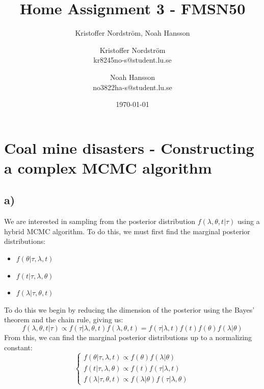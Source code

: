 \documentclass[a4paper]{article}
\title{Home Assignment 3 - FMSN50}
\author{Kristoffer Nordström, Noah Hansson}\author{Kristoffer Nordström \\ kr8245no-s@student.lu.se \and  Noah Hansson \\ no3822ha-s@student.lu.se}
\date{\today}
\begin{document}
\maketitle
\newpage

\section*{Coal mine disasters - Constructing a complex MCMC algorithm}


\subsection*{a)}
We are interested in sampling from the posterior distribution $f(\lambda, \theta, t | \tau)$ using a hybrid MCMC algorithm. To do this, we must first find the marginal posterior distributions:
\begin{itemize}
    \item $f(\theta | \tau, \lambda, t)$
    \item $f(t | \tau, \lambda, \theta)$
    \item $f(\lambda | \tau, \theta, t)$
\end{itemize}

To do this we begin by reducing the dimension of the posterior using the Bayes' theorem and the chain rule, giving us:
\begin{equation}
    f(\lambda, \theta, t | \tau) \propto f(\tau|\lambda, \theta, t)f(\lambda, \theta,t) = f(\tau|\lambda,t)f(t)f(\theta)f(\lambda|\theta)
\end{equation}
From this, we can find the marginal posterior distributions up to a normalizing constant:
\begin{equation}
    \begin{cases}
        f(\theta | \tau, \lambda, t) \propto f(\theta)f(\lambda|\theta) \\
        f(t | \tau, \lambda, \theta) \propto f(t)f(\tau|\lambda,t) \\
        f(\lambda | \tau, \theta, t) \propto f(\lambda|\theta)f(\tau|\lambda,\theta)
    \end{cases}
\end{equation}
\end{document}
